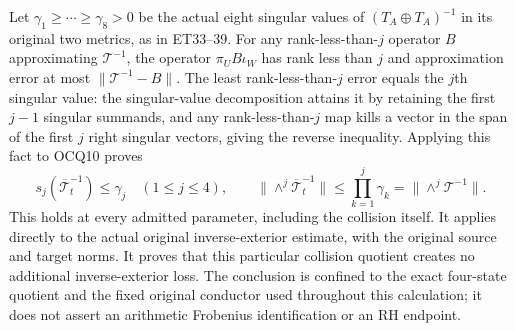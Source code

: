 Let $\gamma_1\ge\cdots\ge\gamma_8>0$ be the actual eight singular
values of $(T_A\oplus T_A)^{-1}$ in its original two metrics, as in
ET33--39. For any rank-less-than-$j$ operator $B$ approximating
$\mathcal T^{-1}$, the operator $\pi_U B\iota_W$ has rank less than
$j$ and approximation error at most $\|\mathcal T^{-1}-B\|$.
The least rank-less-than-$j$ error equals the $j$th singular value:
the singular-value decomposition attains it by retaining the first
$j-1$ singular summands, and any rank-less-than-$j$ map kills a vector
in the span of the first $j$ right singular vectors, giving the reverse
inequality. Applying this fact to OCQ10 proves
\[
 s_j(\overline{\mathcal T}_t^{-1})\le\gamma_j\quad(1\le j\le4),
 \qquad
 \boxed{\|\wedge^j\overline{\mathcal T}_t^{-1}\|
       \le\prod_{k=1}^j\gamma_k
       =\|\wedge^j\mathcal T^{-1}\|.}
 \tag{OCQ11}
\]
This holds at every admitted parameter, including the collision itself.
It applies directly to the actual original inverse-exterior estimate,
with the original source and target norms. It proves that this
particular collision quotient creates no additional inverse-exterior
loss. The conclusion is confined to the exact four-state quotient
and the fixed original conductor used throughout this calculation;
it does not assert an arithmetic Frobenius identification or an RH
endpoint.
